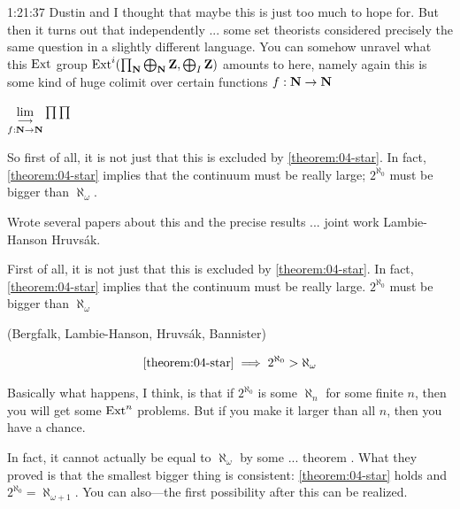 \begin{unfinished}{1:21:37}
Dustin and I thought that maybe this is just too much to hope for. But then it turns out that independently ... some set theorists considered precisely the same question in a slightly different language.
You can somehow unravel what this $\operatorname{Ext}$ group $\operatorname{Ext}^i(\prod_\mathbf N \bigoplus_\mathbf N \mathbf Z, \bigoplus_I \mathbf Z)$ amounts to here, namely again this is some kind of huge colimit over certain functions $f: \mathbf N \to \mathbf N$ %

$\mathop{\operatorname*{lim}\limits_{\longrightarrow}}\limits_{f: \mathbf N \to \mathbf N} \prod \prod $

So first of all, it is not just that this is excluded by \ref{theorem:04-star}. In fact, \ref{theorem:04-star} implies that the continuum must be really large; $2^{\aleph_0}$ must be bigger than $\aleph_\omega$. 

Wrote several papers about this and the precise results ... joint work Lambie-Hanson Hruvsák.

First of all, it is not just that this is excluded by \ref{theorem:04-star}.
In fact, \ref{theorem:04-star} implies that the continuum must be really large.
$2^{\aleph_0}$ must be bigger than $\aleph_\omega$

\begin{theorem} (Bergfalk, Lambie-Hanson, Hruvsák, Bannister) \label{theorem:04-bergfalk}

\begin{align*}
\ref{theorem:04-star} \implies 2^{\aleph_0} > \aleph_\omega
\end{align*}

\end{theorem}

Basically what happens, I think, is that if $2^{\aleph_0}$ is some $\aleph_n$ for some finite $n$, then you will get some $\operatorname{Ext}^n$ problems. But if you make it larger than all $n$, then you have a chance. 

In fact, it cannot actually be equal to $\aleph_\omega$ by some ... theorem . 
What they proved is that the smallest bigger thing is consistent: \ref{theorem:04-star} holds and $2^{\aleph_0} = \aleph_{\omega+1}$. You can also---the first possibility after this can be realized.


\end{unfinished}
